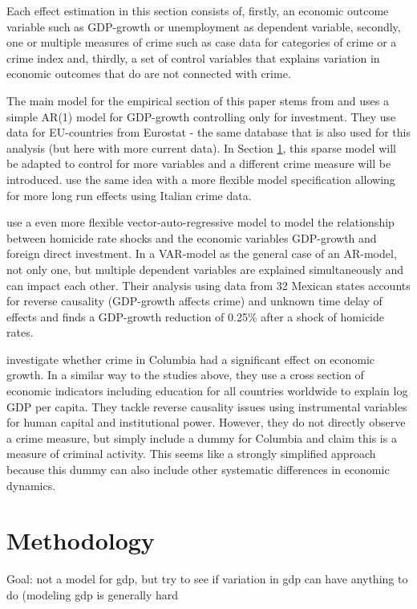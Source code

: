 \documentclass[a4paper,12pt]{article}
\begin{document}
Each effect estimation in this section consists of, firstly, an economic outcome variable such as GDP-growth or unemployment as dependent variable, secondly, one or multiple measures of crime such as case data for categories of crime or a crime index and, thirdly, a set of control variables that explains variation in economic outcomes that do are not connected with crime. 

The main model for the empirical section of this paper stems from \cite{entorf} and uses a simple AR(1) model for GDP-growth controlling only for investment. They use data for EU-countries from Eurostat - the same database that is also used for this analysis (but here with more current data). 
In Section \ref{Methodology}, this sparse model will be adapted to control for more variables and a different crime measure will be introduced.
\cite{detotto} use the same idea with a more flexible model specification allowing for more long run effects using Italian crime data.

\cite{var_model} use a even more flexible vector-auto-regressive model to model the relationship between homicide rate shocks and the economic variables GDP-growth and foreign direct investment. In a VAR-model as the general case of an AR-model, not only one, but multiple dependent variables are explained simultaneously and can impact each other. Their analysis using data from 32 Mexican states accounts for reverse causality (GDP-growth affects crime) and unknown time delay of effects and finds a GDP-growth reduction of 0.25\% after a shock of homicide rates.

\cite{columbia} investigate whether crime in Columbia had a significant effect on economic growth. In a similar way to the studies above, they use a cross section of economic indicators including education for all countries worldwide to explain log GDP per capita. They tackle reverse causality issues using instrumental variables for human capital and institutional power. However, they do not directly observe a crime measure, but simply include a dummy for Columbia and claim this is a measure of criminal activity. This seems like a strongly simplified approach because this dummy can also include other systematic differences in economic dynamics. 



\section{Methodology}
\label{Methodology}
Goal: not a model for gdp, but try to see if variation in gdp can have anything to do  (modeling gdp is generally hard
\end{document}
